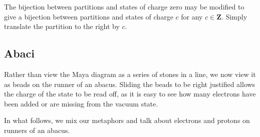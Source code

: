 \documentclass{amsart}[12pt]
\theoremstyle{definition}
\newcommand{\Z}{\mathbf{Z}}
\begin{document}
The bijection between partitions and states of charge zero may be
modified to give a bijection between partitions and states of charge $c$ for any $c\in\Z$.   Simply translate the partition to the right by $c$.



\subsection{Abaci}

Rather than view the Maya diagram as a series of stones in a line, we
now view it as beads on the runner of an abacus.  Sliding the beads
to be right justified allows the charge of the state to be read off,
as it is easy to see how many electrons have been added or are missing
from the vacuum state.

In what follows, we mix our metaphors and talk about electrons and protons on runners of an abacus.
\end{document}

